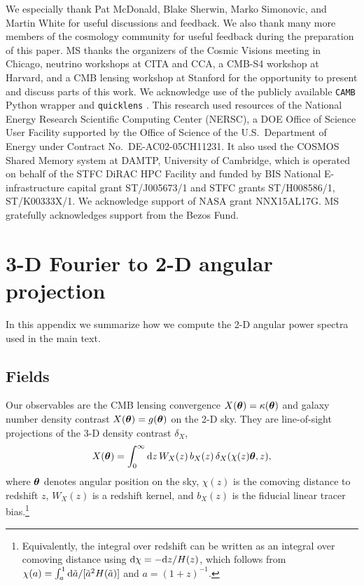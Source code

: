 \documentclass[prd,superscriptaddress,floatfix,notitlepage,nofootinbib,reprint]{revtex4-1} %
\begin{document}
We especially thank Pat McDonald, Blake Sherwin, Marko Simonovic, and Martin White for useful discussions and feedback.
We also thank many more members of the cosmology community for useful feedback during the preparation of this paper.
MS thanks the organizers of the Cosmic Visions meeting in Chicago, neutrino workshops at CITA and CCA, a CMB-S4 workshop at Harvard, and a CMB lensing workshop at Stanford for the opportunity to present and discuss parts of this work.
We acknowledge use of the publicly available \texttt{CAMB} Python wrapper \cite{cambpython,camb} and \texttt{quicklens} \cite{quicklens,PlanckLensing2015}.
This research used resources of the National Energy Research Scientific Computing Center (NERSC), a DOE Office of Science User Facility supported by the Office of Science of the U.S.~Department of Energy under Contract No.~DE-AC02-05CH11231.
It also used the COSMOS Shared Memory system at DAMTP, University of Cambridge, which is operated on behalf of the STFC DiRAC HPC Facility and funded by BIS National E-infrastructure capital grant ST/J005673/1 and STFC grants ST/H008586/1, ST/K00333X/1.
We acknowledge support of NASA grant NNX15AL17G.
MS gratefully acknowledges support from the Bezos Fund.



\appendix





\section{3-D Fourier to 2-D angular projection}
\label{app:3dto2d}

In this appendix we summarize how we compute the 2-D angular power spectra used in the main text.

\subsection{Fields}

Our observables are the CMB lensing convergence $X(\boldsymbol\theta)=\kappa(\boldsymbol\theta)$ and galaxy number density contrast $X(\boldsymbol\theta)=g(\boldsymbol\theta)$ on the 2-D sky.  They are
line-of-sight projections of the 3-D density contrast $\delta_X$,
\begin{align}
  \label{eq:12}
  X(\boldsymbol\theta) = \int_0^\infty \mathrm{d} z\,W_X(z)\,b_X(z)\,\delta_X(\chi(z)\boldsymbol\theta,z),
\end{align}
where $\boldsymbol\theta$ denotes angular position on the sky, $\chi(z)$ is the comoving distance to redshift $z$, $W_X(z)$ is a redshift kernel, and $b_X(z)$ is the fiducial linear tracer bias.\footnote{Equivalently, the integral over redshift can be written as an integral over comoving distance using $\mathrm{d}\chi=-\mathrm{d} z/H(z)$, which follows from $\chi(a)=\int_a^1\mathrm{d} \tilde a/[\tilde a^2H(\tilde a)]$ and $a=(1+z)^{-1}$.}
\end{document}
